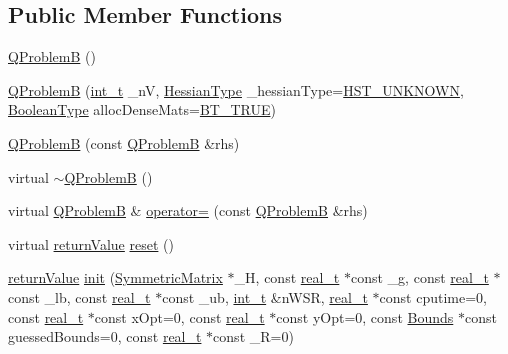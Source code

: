 \subsection*{Public Member Functions}
\begin{DoxyCompactItemize}
\item 
\hyperlink{class_q_problem_b_a130f38af91d808933e0f89948a82d030}{Q\+ProblemB} ()
\item 
\hyperlink{class_q_problem_b_aea8e763194471ee707b3c61da23d8e62}{Q\+ProblemB} (\hyperlink{_types_8hpp_ab6fd6105e64ed14a0c9281326f05e623}{int\+\_\+t} \+\_\+nV, \hyperlink{_types_8hpp_a604cad5cda14e378ce4a77ab28ee9fd9}{Hessian\+Type} \+\_\+hessian\+Type=\hyperlink{_types_8hpp_a604cad5cda14e378ce4a77ab28ee9fd9a3479cf4e632ae731d4da9bf57a9f8907}{H\+S\+T\+\_\+\+U\+N\+K\+N\+O\+WN}, \hyperlink{_types_8hpp_a20f82124c82b6f5686a7fce454ef9089}{Boolean\+Type} alloc\+Dense\+Mats=\hyperlink{_types_8hpp_a20f82124c82b6f5686a7fce454ef9089a34c57965bfb07125b09326a69019f9c6}{B\+T\+\_\+\+T\+R\+UE})
\item 
\hyperlink{class_q_problem_b_a370995d62be6dbeef2415b3882c00fe7}{Q\+ProblemB} (const \hyperlink{class_q_problem_b}{Q\+ProblemB} \&rhs)
\item 
virtual \hyperlink{class_q_problem_b_a9b7c6eb715d0d16ff8f3e7882b3982e7}{$\sim$\+Q\+ProblemB} ()
\item 
virtual \hyperlink{class_q_problem_b}{Q\+ProblemB} \& \hyperlink{class_q_problem_b_aefdce5618a0c88d7677b5783b6e40578}{operator=} (const \hyperlink{class_q_problem_b}{Q\+ProblemB} \&rhs)
\item 
virtual \hyperlink{_message_handling_8hpp_a81d556f613bfbabd0b1f9488c0fa865e}{return\+Value} \hyperlink{class_q_problem_b_a975c13e1a8fbe8c3e9c4dfbce9dc9a71}{reset} ()
\item 
\hyperlink{_message_handling_8hpp_a81d556f613bfbabd0b1f9488c0fa865e}{return\+Value} \hyperlink{class_q_problem_b_ac64a41e4a05fe92f4786ac3eebdf0d0e}{init} (\hyperlink{class_symmetric_matrix}{Symmetric\+Matrix} $\ast$\+\_\+H, const \hyperlink{qp_o_a_s_e_s__wrapper_8h_a0d00e2b3dfadee81331bbb39068570c4}{real\+\_\+t} $\ast$const \+\_\+g, const \hyperlink{qp_o_a_s_e_s__wrapper_8h_a0d00e2b3dfadee81331bbb39068570c4}{real\+\_\+t} $\ast$const \+\_\+lb, const \hyperlink{qp_o_a_s_e_s__wrapper_8h_a0d00e2b3dfadee81331bbb39068570c4}{real\+\_\+t} $\ast$const \+\_\+ub, \hyperlink{_types_8hpp_ab6fd6105e64ed14a0c9281326f05e623}{int\+\_\+t} \&n\+W\+SR, \hyperlink{qp_o_a_s_e_s__wrapper_8h_a0d00e2b3dfadee81331bbb39068570c4}{real\+\_\+t} $\ast$const cputime=0, const \hyperlink{qp_o_a_s_e_s__wrapper_8h_a0d00e2b3dfadee81331bbb39068570c4}{real\+\_\+t} $\ast$const x\+Opt=0, const \hyperlink{qp_o_a_s_e_s__wrapper_8h_a0d00e2b3dfadee81331bbb39068570c4}{real\+\_\+t} $\ast$const y\+Opt=0, const \hyperlink{class_bounds}{Bounds} $\ast$const guessed\+Bounds=0, const \hyperlink{qp_o_a_s_e_s__wrapper_8h_a0d00e2b3dfadee81331bbb39068570c4}{real\+\_\+t} $\ast$const \+\_\+R=0)

\end{DoxyCompactItemize}
